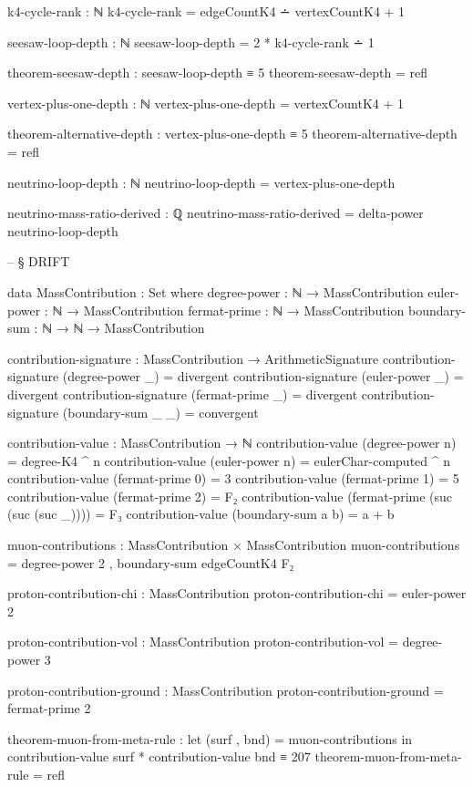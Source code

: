 \documentclass[11pt,a4paper]{book}
\begin{document}
\begin{code}
k4-cycle-rank : ℕ
k4-cycle-rank = edgeCountK4 ∸ vertexCountK4 + 1

seesaw-loop-depth : ℕ
seesaw-loop-depth = 2 * k4-cycle-rank ∸ 1

theorem-seesaw-depth : seesaw-loop-depth ≡ 5
theorem-seesaw-depth = refl

vertex-plus-one-depth : ℕ
vertex-plus-one-depth = vertexCountK4 + 1

theorem-alternative-depth : vertex-plus-one-depth ≡ 5
theorem-alternative-depth = refl

neutrino-loop-depth : ℕ
neutrino-loop-depth = vertex-plus-one-depth

neutrino-mass-ratio-derived : ℚ
neutrino-mass-ratio-derived = delta-power neutrino-loop-depth



-- § DRIFT

data MassContribution : Set where
  degree-power : ℕ → MassContribution
  euler-power  : ℕ → MassContribution
  fermat-prime : ℕ → MassContribution
  boundary-sum : ℕ → ℕ → MassContribution

contribution-signature : MassContribution → ArithmeticSignature
contribution-signature (degree-power _) = divergent
contribution-signature (euler-power _)  = divergent
contribution-signature (fermat-prime _) = divergent
contribution-signature (boundary-sum _ _) = convergent

contribution-value : MassContribution → ℕ
contribution-value (degree-power n) = degree-K4 ^ n
contribution-value (euler-power n)  = eulerChar-computed ^ n
contribution-value (fermat-prime 0) = 3
contribution-value (fermat-prime 1) = 5
contribution-value (fermat-prime 2) = F₂
contribution-value (fermat-prime (suc (suc (suc _)))) = F₃
contribution-value (boundary-sum a b) = a + b

muon-contributions : MassContribution × MassContribution
muon-contributions = degree-power 2 , boundary-sum edgeCountK4 F₂

proton-contribution-chi : MassContribution
proton-contribution-chi = euler-power 2

proton-contribution-vol : MassContribution
proton-contribution-vol = degree-power 3

proton-contribution-ground : MassContribution
proton-contribution-ground = fermat-prime 2

theorem-muon-from-meta-rule : 
  let (surf , bnd) = muon-contributions
  in contribution-value surf * contribution-value bnd ≡ 207
theorem-muon-from-meta-rule = refl


\end{code}
\end{document}
